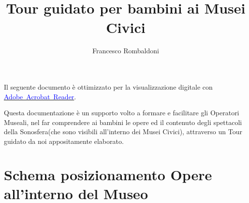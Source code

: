 \documentclass[hidelinks,12pt,a4paper]{article}
\begin{document}
	\begin{flushleft}

	\LARGE
	
	\title{\textbf{\\Tour guidato per bambini ai Musei Civici}}
	\author{Francesco Rombaldoni}
	\date{}
	
	\maketitle
	
	\begin{adjustwidth}{-30mm}{-30mm}
		\vspace*{\fill}
		\centering
		\fboxrule=2pt
		\fbox
		{
			\begin{minipage}{0.85\linewidth}
				Il seguente documento è ottimizzato per la visualizzazione digitale con \href{https://get.adobe.com/it/reader/}{\textcolor{blue}{Adobe~Acrobat~Reader}}.  
			\end{minipage}
		}
	\end{adjustwidth}
	
	\setcounter{page}{1}
	\newpage
	\vspace*{\fill}
	Questa documentazione è un supporto volto a formare e facilitare gli Operatori Museali, nel far comprendere ai bambini le opere ed il contenuto degli spettacoli della Sonosfera(che sono visibili all'interno dei Musei Civici), attraverso un Tour guidato da noi appositamente elaborato.
	\vspace*{\fill}
	\newpage
	\tableofcontents
	\newpage
	
	\section{Schema posizionamento Opere all'interno del Museo}
	
	\begin{center}
	\end{center}
	

\end{flushleft}
\end{document}
